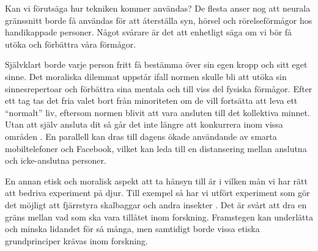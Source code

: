\documentclass[12pt, a4paper]{article}
\begin{document}
Kan vi förutsäga hur tekniken kommer användas? De flesta anser nog att neurala
gränssnitt borde få användas för att återställa syn, hörsel och rörelseförmågor
hos handikappade personer. Något svårare är det att enhetligt säga om vi bör få
utöka och förbättra våra förmågor.

Självklart borde varje person fritt få bestämma över sin egen kropp och sitt
eget sinne. Det moraliska dilemmat uppstår ifall normen skulle bli att utöka sin
sinnesrepertoar och förbättra sina mentala och till viss del fysiska förmågor.
Efter ett tag tas det fria valet bort från minoriteten om de vill fortsätta att
leva ett ``normalt'' liv, eftersom normen blivit att vara ansluten till det
kollektiva minnet. Utan att själv ansluta dit så går det inte längre att
konkurrera inom vissa områden \cite{ethics_eu} \cite{ethics1}. En parallell kan
dras till dagens ökade användande av smarta mobiltelefoner och Facebook, vilket
kan leda till en distansering mellan anslutna och icke-anslutna personer.

En annan etisk och moralisk aspekt att ta hänsyn till är i vilken mån vi har
rätt att bedriva experiment på djur. Till exempel så har vi utfört experiment
som gör det möjligt att fjärrstyra skalbaggar och andra insekter \cite{ethics2}.
Det är svårt att dra en gräns mellan vad som ska vara tillåtet inom forskning.
Framstegen kan underlätta och minska lidandet för så många, men samtidigt borde
vissa etiska grundprinciper krävas inom forskning.







%
%



\pagebreak


\end{document}
